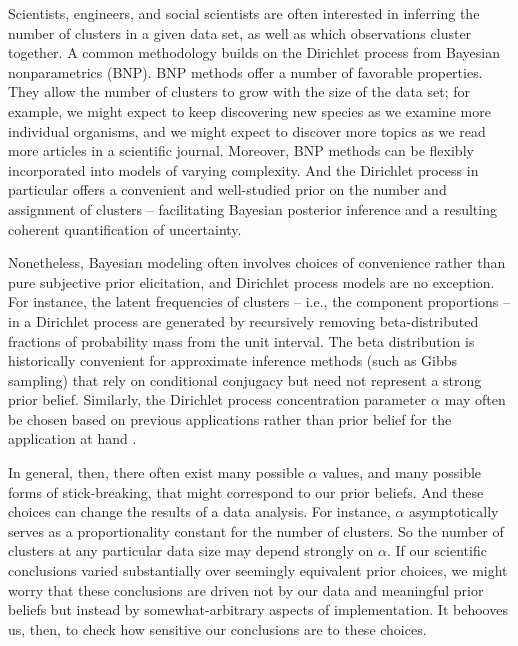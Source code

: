 Scientists, engineers, and social scientists are often interested in inferring
the number of clusters in a given data set, as well as which observations
cluster together. A common methodology builds on the Dirichlet process
\citep{ferguson:1973:bayesian, sethuraman:1994:constructivedp} from Bayesian
nonparametrics (BNP). BNP methods offer a number of favorable properties. They
allow the number of clusters to grow with the size of the data set; for example,
we might expect to keep discovering new species as we examine more individual
organisms, and we might expect to discover more topics as we read more articles
in a scientific journal. Moreover, BNP methods can be flexibly incorporated into
models of varying complexity. And the Dirichlet process in particular offers a
convenient and well-studied prior on the number and assignment of clusters --
facilitating Bayesian posterior inference and a resulting coherent
quantification of uncertainty.

Nonetheless, Bayesian modeling often involves choices of convenience rather than
pure subjective prior elicitation, and Dirichlet process models are no
exception. For instance, the latent frequencies of clusters -- i.e., the
component proportions -- in a Dirichlet process are generated by recursively
removing beta-distributed fractions of probability mass from the unit interval.
The beta distribution is historically convenient for approximate inference
methods (such as Gibbs sampling) that rely on conditional conjugacy but need not
represent a strong prior belief. Similarly, the Dirichlet process concentration
parameter $\alpha$ may often be chosen based on previous applications rather
than prior belief for the application at hand
\citep[Chapter 23]{gelman:2013:bda}. 

In general, then, there often exist many possible $\alpha$ values, and many
possible forms of stick-breaking, that might correspond to our prior beliefs.
And these choices can change the results of a data analysis. For instance,
$\alpha$ asymptotically serves as a proportionality constant for the number of
clusters. So the number of clusters at any particular data size may depend
strongly on $\alpha$. If our scientific conclusions varied substantially over
seemingly equivalent prior choices, we might worry that these conclusions are
driven not by our data and meaningful prior beliefs but instead by
somewhat-arbitrary aspects of implementation. It behooves us, then, to check how
sensitive our conclusions are to these choices.

